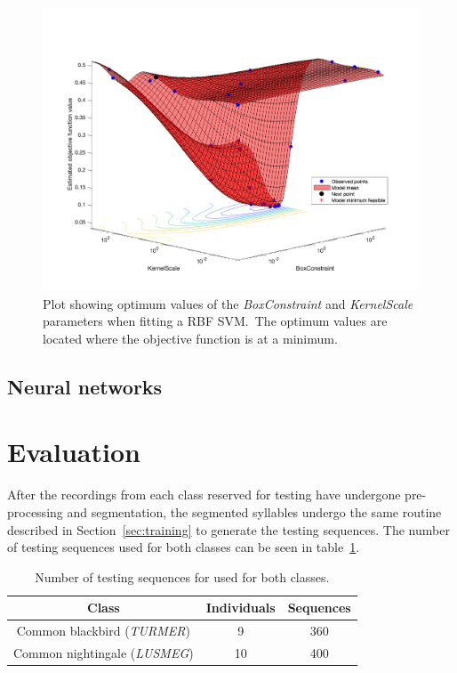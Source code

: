 \begin{figure}[ht]
  \centering
  \includegraphics[width=\textwidth]{figures/rbf_optim.png}
  \caption{Plot showing optimum values of the \textit{BoxConstraint} and
  \textit{KernelScale} parameters when fitting a RBF SVM.\ The optimum values
are located where the objective function is at a
minimum.}\label{fig:rbf_optim}
\end{figure}

\subsection{Neural networks}

\section{Evaluation}

After the recordings from each class reserved for testing have undergone
pre-processing and segmentation, the segmented syllables undergo the same
routine described in Section~\ref{sec:training} to generate the testing
sequences. The number of testing sequences used for both classes can be seen in
table~\ref{table:testing_samples}.

\begin{table}[h!t]
\begin{center}
\begin{tabular}{c c c}
\toprule
Class & Individuals & Sequences \\ [0.5ex]
\midrule
Common blackbird (\textit{TURMER}) & 9 & 360 \\
Common nightingale (\textit{LUSMEG}) & 10 & 400 \\
\bottomrule
\end{tabular}
\caption{Number of testing sequences for used for both
classes.}\label{table:testing_samples}
\end{center}
\end{table}

